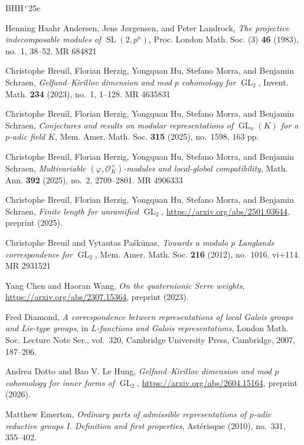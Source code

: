 \documentclass{article}
\numberwithin{equation}{section}
\DeclareMathOperator{\GL}{GL}
\DeclareMathOperator{\SL}{SL}
\newcommand{\cO}{\mathcal{O}}
\begin{document}
\begin{thebibliography}{BHH$^+$25c}

Henning Haahr Andersen, Jens J{\o}rgensen, and Peter Landrock,
\textit{The projective indecomposable modules of $\SL(2,p^n)$},
Proc. London Math. Soc. (3) \textbf{46} (1983), no.~1, 38--52. MR 684821

Christophe Breuil, Florian Herzig, Yongquan Hu, Stefano Morra, and Benjamin Schraen,
\textit{Gelfand--Kirillov dimension and mod $p$ cohomology for $\GL_2$},
Invent. Math. \textbf{234} (2023), no.~1, 1--128. MR 4635831

Christophe Breuil, Florian Herzig, Yongquan Hu, Stefano Morra, and Benjamin Schraen,
\textit{Conjectures and results on modular representations of $\GL_n(K)$ for a $p$-adic field $K$},
Mem. Amer. Math. Soc. \textbf{315} (2025), no.~1598, 163 pp.

Christophe Breuil, Florian Herzig, Yongquan Hu, Stefano Morra, and Benjamin Schraen,
\textit{Multivariable $(\varphi,\cO_K^\times)$-modules and local-global compatibility},
Math. Ann. \textbf{392} (2025), no.~2, 2709--2801. MR 4906333

Christophe Breuil, Florian Herzig, Yongquan Hu, Stefano Morra, and Benjamin Schraen,
\textit{Finite length for unramified $\GL_2$},
\url{https://arxiv.org/abs/2501.03644}, preprint (2025).

Christophe Breuil and Vytautas Pa{\v{s}}k{\=u}nas,
\textit{Towards a modulo $p$ Langlands correspondence for $\GL_2$},
Mem. Amer. Math. Soc. \textbf{216} (2012), no.~1016, vi+114. MR 2931521

Yang Chen and Haoran Wang,
\textit{On the quaternionic Serre weights},
\url{https://arxiv.org/abs/2307.15364}, preprint (2023).

Fred Diamond,
\textit{A correspondence between representations of local Galois groups and Lie-type groups},
in \textit{$L$-functions and Galois representations},
London Math. Soc. Lecture Note Ser., vol.~320,
Cambridge University Press, Cambridge, 2007, 187--206.

Andrea Dotto and Bao V. Le Hung,
\textit{Gelfand--Kirillov dimension and mod $p$ cohomology for inner forms of $\GL_2$},
\url{https://arxiv.org/abs/2604.15164}, preprint (2026).

Matthew Emerton,
\textit{Ordinary parts of admissible representations of $p$-adic reductive groups I. Definition and first properties},
Ast\'erisque (2010), no.~331, 355--402.


\end{thebibliography}
\end{document}
